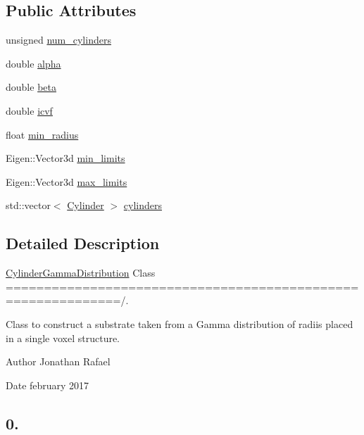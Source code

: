 \subsection*{Public Attributes}
\begin{DoxyCompactItemize}
\item 
unsigned \hyperlink{class_cylinder_gamma_distribution_af74583662a4f33ba1565f2c71e6bbc5a}{num\+\_\+cylinders}
\item 
double \hyperlink{class_cylinder_gamma_distribution_a8cae528f51692ed05049e4ea06c63722}{alpha}
\item 
double \hyperlink{class_cylinder_gamma_distribution_a601a42ef7bacbf9696229efbd703f61e}{beta}
\item 
double \hyperlink{class_cylinder_gamma_distribution_a31f82c4608b7cd2b022805e30a4db983}{icvf}
\item 
float \hyperlink{class_cylinder_gamma_distribution_aece7d3ec40d3dbb3a2ecd1bd88c5a694}{min\+\_\+radius}
\item 
Eigen\+::\+Vector3d \hyperlink{class_cylinder_gamma_distribution_ac77a9d794f2f2000066c4a26f19a9097}{min\+\_\+limits}
\item 
Eigen\+::\+Vector3d \hyperlink{class_cylinder_gamma_distribution_aa7094851c2ccf05fc5ff7a99707aa786}{max\+\_\+limits}
\item 
std\+::vector$<$ \hyperlink{class_cylinder}{Cylinder} $>$ \hyperlink{class_cylinder_gamma_distribution_a3e8265a7ddb15d895112e02bd66fbf67}{cylinders}
\end{DoxyCompactItemize}


\subsection{Detailed Description}
\hyperlink{class_cylinder_gamma_distribution}{Cylinder\+Gamma\+Distribution} Class =============================================================/. 

Class to construct a substrate taken from a Gamma distribution of radiis placed in a single voxel structure. \begin{DoxyAuthor}{Author}
Jonathan Rafael 
\end{DoxyAuthor}
\begin{DoxyDate}{Date}
february 2017 \subsection*{0. }
\end{DoxyDate}


